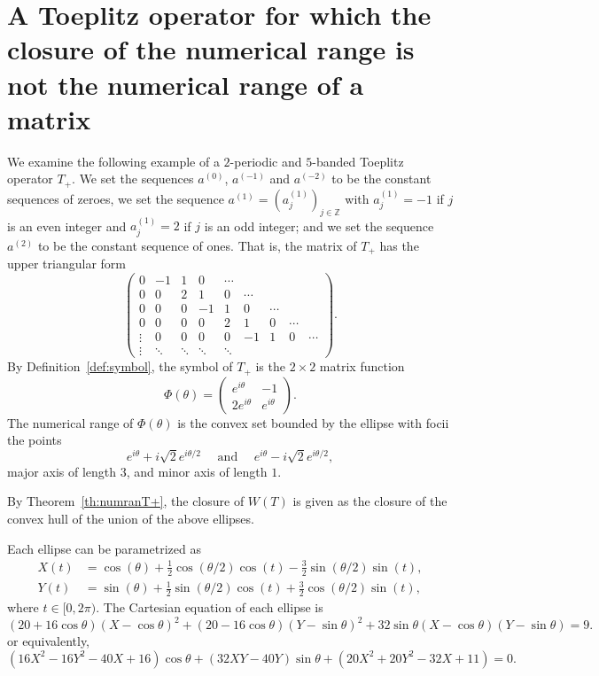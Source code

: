 \documentclass[12pt,reqno]{amsart}
\theoremstyle{definition}
\newcommand{\Z}{{\mathbb{Z}}}
\begin{document}
 \section{A Toeplitz operator for which the closure of the numerical range is not the numerical range of a matrix} 

We examine the following example of a $2$-periodic and $5$-banded Toeplitz operator $T_+$. We set the sequences $a^{(0)}$, $a^{(-1)}$ and $a^{(-2)}$ to be the constant sequences of zeroes, we set the sequence $a^{(1)}=\left(a_j^{(1)}\right)_{j\in \Z}$ with $a_j^{(1)}=-1$ if $j$ is an even integer and $a_j^{(1)}=2$ if $j$ is an odd integer; and we set the sequence $a^{(2)}$ to be the constant sequence of ones. That is, the matrix of $T_+$ has the upper triangular form
\begin{equation}\label{ex:counter}
\begin{pmatrix}
0 & -1 & 1 &  0 & \cdots \\
0 & 0  & 2 &  1 & 0 & \cdots  \\
0 & 0  & 0 & -1 & 1 & 0 & \cdots \\
0 & 0 & 0  & 0 & 2 & 1 & 0 & \cdots \\
\vdots & 0 & 0 & 0  & 0 & -1 & 1 & 0 & \cdots \\
\vdots & \ddots &\ddots &\ddots &\ddots 
\end{pmatrix}.
\end{equation}
By Definition~\ref{def:symbol}, the symbol of $T_+$ is the $2\times 2$ matrix function
\[
\Phi(\theta)=\begin{pmatrix}
e^{i \theta} & -1 \\
2 e^{i\theta} & e^{i\theta}
\end{pmatrix}.
\]
The numerical range of $\Phi(\theta)$ is the convex set bounded by the ellipse with focii the points 
\[
e^{i\theta}+ i \sqrt{2}  e^{i \theta/2} \quad \text{ and } \quad e^{i\theta}- i \sqrt{2} e^{i \theta/2},
\]
major axis of length $3$, and minor axis of length $1$.

By Theorem~\ref{th:numranT+}, the closure of $W(T)$ is given as the closure of the convex hull of the union of the above ellipses.

Each ellipse can be parametrized as
\begin{align*}
X(t)&=\cos(\theta) + \frac12 \cos(\theta/2) \cos(t) - \frac32 \sin(\theta/2) \sin(t),\\
Y(t)&=\sin(\theta) + \frac12 \sin(\theta/2) \cos(t) + \frac32 \cos(\theta/2) \sin(t),
\end{align*}
where $t\in [0, 2\pi)$. The Cartesian equation of each ellipse is
\[
(20 +16 \cos \theta)(X -\cos \theta)^2 +(20-16 \cos \theta)(Y-\sin \theta)^2 +32\sin \theta (X -\cos \theta)(Y -\sin \theta)=9.
\]
or equivalently,
\[
(16 X^2-16 Y^2 - 40 X +16 )\cos \theta + (32 X Y -40 Y)  \sin \theta + (20 X^2 + 20 Y^2 - 32 X + 11)=0.
\]
\end{document}
